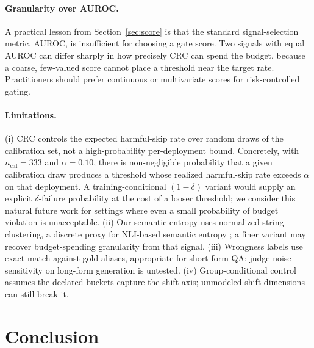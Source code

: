 \documentclass[a4paper,fleqn]{cas-dc}
\begin{document}
\paragraph{Granularity over AUROC.} A practical lesson from
Section~\ref{sec:score} is that the standard signal-selection metric, AUROC, is
insufficient for choosing a gate score. Two signals with equal AUROC can differ
sharply in how precisely CRC can spend the budget, because a coarse, few-valued
score cannot place a threshold near the target rate. Practitioners should prefer
continuous or multivariate scores for risk-controlled gating.

\paragraph{Limitations.} (i) CRC controls the expected harmful-skip rate
over random draws of the calibration set, not a high-probability per-deployment
bound. Concretely, with $n_{\text{cal}}=333$ and $\alpha=0.10$, there is
non-negligible probability that a given calibration draw produces a threshold
whose realized harmful-skip rate exceeds $\alpha$ on that deployment. A
training-conditional $(1-\delta)$ variant \citep{bates2021riskcontrolling} would
supply an explicit $\delta$-failure probability at the cost of a looser threshold;
we consider this natural future work for settings where even a small probability
of budget violation is unacceptable. (ii) Our semantic entropy uses normalized-string clustering, a discrete
proxy for NLI-based semantic entropy \citep{kuhn2023semantic}; a finer variant
may recover budget-spending granularity from that signal. (iii) Wrongness labels
use exact match against gold aliases, appropriate for short-form QA; judge-noise
sensitivity on long-form generation is untested. (iv) Group-conditional control
assumes the declared buckets capture the shift axis; unmodeled shift dimensions
can still break it.

\section{Conclusion}\label{sec:conclusion}
\end{document}
